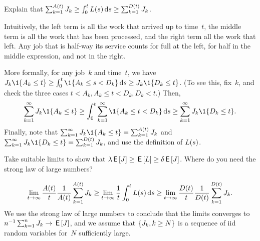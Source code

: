 \documentclass[queueing-book.tex]{subfiles}
\begin{document}
\begin{exercise}\label{ex:l-220}
Explain that $\sum_{k=1}^{A(t)} J_k \geq \int_0^t L(s) \,\textrm{d}s \geq \sum_{k=1}^{D(t)} J_k$.
\begin{solution}
 Intuitively, the left term is all the work that arrived up to time~$t$, the middle term is all the work that has been processed, and the right term all the work that left.
 Any job that is half-way its service counts for full at the left, for half in the middle expression, and not in the right.

 More formally, for any job~$k$ and time~$t$, we have $\J_k \1{A_k \leq t} \geq \int_0^t \1{A_k \leq s < D_k } \d s \geq \J_k \1{D_k \leq t}$. (To see this, fix~$k$, and check the three cases $t < A_k, A_k \leq t < D_k, D_k < t$.) Then,
 \begin{equation*}
 \sum_{k=1}^\infty \J_k \1{A_k \leq t} \geq \int_0^t \sum_{k=1}^\infty \1{A_k \leq t < D_k} \d s \geq \sum_{k=1}^\infty \J_k \1{D_k \leq t}.
 \end{equation*}
 Finally, note that $ \sum_{k=1}^\infty \J_k \1{A_k \leq t} = \sum_{k=1}^{A(t)} \J_k$ and $ \sum_{k=1}^\infty \J_k \1{D_k \leq t} = \sum_{k=1}^{D(t)} \J_k$, and use the definition of $L(s)$.
\end{solution}
\end{exercise}

\begin{exercise}\label{ex:l-221}
Take suitable limits to show that
$\lambda \,\mathsf{E}\left[J\right] \geq \,\mathsf{E}\left[L\right] \geq \delta \,\mathsf{E}\left[J\right]$.
 Where do you need the strong law of large numbers?
\begin{solution}
 \begin{equation*}
 \lim_{t\to\infty} \frac{A(t)}{t}\frac 1{A(t)}\sum_{k=1}^{A(t)} J_k \geq \lim_{t\to \infty} \frac 1 t \int_0^t L(s) \,\textrm{d}s \geq \lim_{t\to\infty} \frac{D(t)}{t}\frac 1{D(t)} \sum_{k=1}^{D(t)} J_k.
 \end{equation*}
 We use the strong law of large numbers to conclude that the limits converges to $n^{-1} \sum_{k=1}^n J_k \to \,\mathsf{E}\left[J\right]$, and we assume that $\{J_k, k\geq N\}$ is a sequence of iid random variables for~$N$ sufficiently large.
\end{solution}
\end{exercise}



\end{document}
